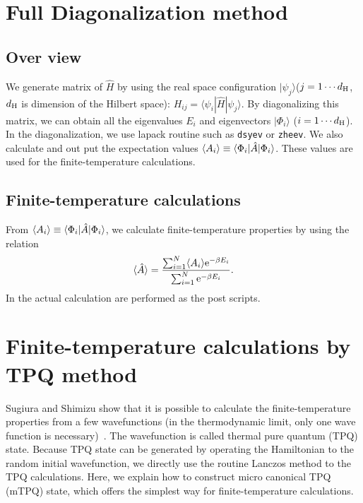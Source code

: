 \section{Full Diagonalization method}
\label{Ch:AllDiagonalization}
\subsection{Over view}
We generate matrix of ${\hat{H}}$ by using the real space configuration 
$| \psi_j \rangle$($j=1\cdots d_{\rm H}$, $d_{\rm H}$ is dimension of the Hilbert space): 
$H_{ij}= \langle \psi_i | {\hat H} | \psi_j \rangle$.
By diagonalizing this matrix,
we can obtain all the eigenvalues $E_{i}$ and eigenvectors $|\Phi_i\rangle$ ($i=1 \cdots d_{\rm H}$). 
In the diagonalization, we use lapack routine such as \verb|dsyev| or \verb|zheev|.
We also calculate and out put
the expectation values $\langle A_i\rangle \equiv \langle \Phi_i | {\hat A} | \Phi_i\rangle$.
These values are used for the finite-temperature calculations.

\subsection{Finite-temperature calculations}
From
$\langle A_i\rangle \equiv \langle \Phi_i | {\hat A} | \Phi_i\rangle$,
we calculate finite-temperature properties by using the relation 
\begin{equation}
\langle {\hat A}\rangle=\frac{\sum_{i=1}^N \langle A_i\rangle {\rm  e}^{-\beta E_i}}{\sum_{i=1}^N{\rm  e}^{-\beta E_i}}.
\end{equation}
In the actual calculation are performed as the post scripts.

\section{Finite-temperature calculations by TPQ method}
\label{Ch:TPQ}
Sugiura and Shimizu show that
it is possible to calculate the finite-temperature properties
from a few wavefunctions (in the thermodynamic limit, only one wave function is necessary)~\cite{Sugiura2012}.
The wavefunction is called thermal pure quantum (TPQ) state.
Because TPQ state can be generated by operating the Hamiltonian 
to the random initial wavefunction,
we directly use the routine Lanczos method to the TPQ calculations.
Here, we explain how to construct micro canonical TPQ (mTPQ) state,
which offers the simplest way for finite-temperature calculations.

